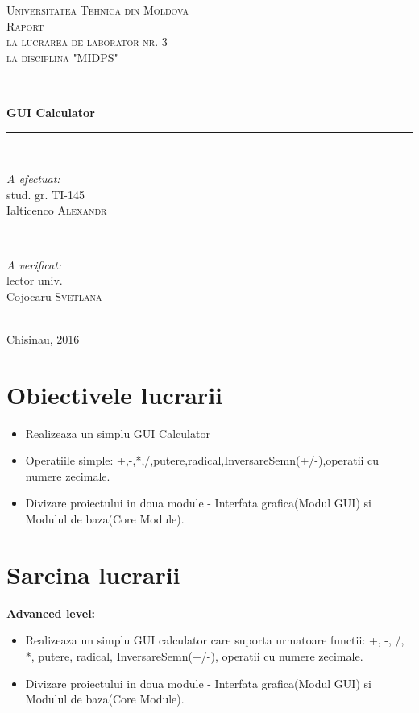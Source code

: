 \documentclass[12pt]{article}
\begin{document}
\begin{titlepage}

\newcommand{\HRule}{\rule{\linewidth}{0.5mm}}

\center 
\textsc{\LARGE Universitatea Tehnica din Moldova}\\[1.5cm] \textsc{\Large Raport}\\[0.5cm] 
\textsc{\large la lucrarea de laborator nr. 3 \\la disciplina "MIDPS"}\\[0.5cm]
\HRule \\[0.4cm]
{ \huge \bfseries GUI Calculator}\\[0.4cm]
\HRule \\[1.5cm]
\begin{minipage}{0.4\textwidth}
\begin{flushleft} \large
\emph{A efectuat:}\\
stud. gr. TI-145\\
Ialticenco \textsc{Alexandr}
\end{flushleft}
\end{minipage}
~
\begin{minipage}{0.4\textwidth}
\begin{flushright} \large
\emph{A verificat:} \\
lector univ.\\
Cojocaru \textsc{Svetlana}
\end{flushright}
\end{minipage}\\[4cm]
\vfill 
{\large Chisinau, 2016}\\[10cm] 
\end{titlepage}
\section*{Obiectivele lucrarii}
\begin{itemize}
\item Realizeaza un simplu GUI Calculator
\item Operatiile simple: +,-,*,/,putere,radical,InversareSemn(+/-),operatii cu numere zecimale.
\item Divizare proiectului in doua module - Interfata grafica(Modul GUI) si Modulul de baza(Core Module).
\end{itemize}

\section* {Sarcina lucrarii}
\textbf{Advanced level:}
\begin{itemize}
\item Realizeaza un simplu GUI calculator care suporta urmatoare functii: +, -, /, *, putere, radical, InversareSemn(+/-), operatii cu numere zecimale.
\item Divizare proiectului in doua module - Interfata grafica(Modul GUI) si Modulul de baza(Core Module).
\end{itemize}
\end{document}
